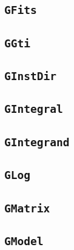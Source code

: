 \documentclass{article}[12pt,a4]
\begin{document}
\subsection{{\tt GFits}}

\subsection{{\tt GGti}}

\subsection{{\tt GInstDir}}

\subsection{{\tt GIntegral}}

\subsection{{\tt GIntegrand}}

\subsection{{\tt GLog}}

\subsection{{\tt GMatrix}}

\newpage
\subsection{{\tt GModel}}
\end{document}
